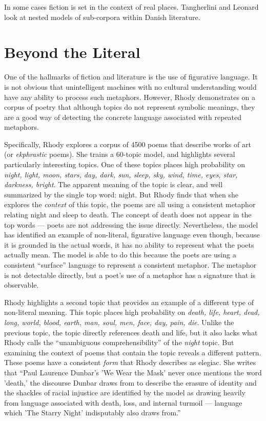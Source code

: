 In some cases fiction is set in the context of real places.
Tangherlini and Leonard \citep{tangherlini-13} look at nested models of sub-corpora within Danish literature.

\section{Beyond the Literal}

One of the hallmarks of fiction and literature is the use of figurative language.
It is not obvious that unintelligent machines with no cultural understanding would have any ability to process such metaphors. However, Rhody \citep{rhody-12} demonstrates on a corpus of poetry that although topics do not represent symbolic meanings, they are a good way of detecting the concrete language associated with repeated metaphors.

Specifically, Rhody explores a corpus of 4500 poems that describe works of art (or {\em ekphrastic} poems).
She trains a 60-topic model, and highlights several particularly interesting topics.
One of these topics places high probability on {\em night, light, moon, stars, day, dark, sun, sleep, sky, wind, time, eyes, star, darkness, bright}.
The apparent meaning of the topic is clear, and well summarized by the single top word: night.
But Rhody finds that when she explores the {\em context} of this topic, the poems are all using a consistent metaphor relating night and sleep to death.
The concept of death does not appear in the top words --- poets are not addressing the issue directly.
Nevertheless, the model has identified an example of non-literal, figurative language even though, because it is grounded in the actual words, it has no ability to represent what the poets actually mean.
The model is able to do this because the poets are using a consistent ``surface'' language to represent a consistent metaphor.
The metaphor is not detectable directly, but a poet's use of a metaphor has a signature that is observable.

Rhody highlights a second topic that provides an example of a different type of non-literal meaning.
This topic places high probability on {\em death, life, heart, dead, long, world, blood, earth, man, soul, men, face, day, pain, die}.
Unlike the previous topic, the topic directly references death and life, but it also lacks what Rhody calls the ``unambiguous comprehensibility'' of the {\em night} topic.
But examining the context of poems that contain the topic reveals a different pattern.
These poems have a consistent {\em form} that Rhody describes as elegiac.
She writes that ``Paul Laurence Dunbar's 'We Wear the Mask' never once mentions the word 'death,' the discourse Dunbar draws from to describe the erasure of identity and the shackles of racial injustice are identified by the model as drawing heavily from language associated with death, loss, and internal turmoil --- language which 'The Starry Night' indisputably also draws from.''

